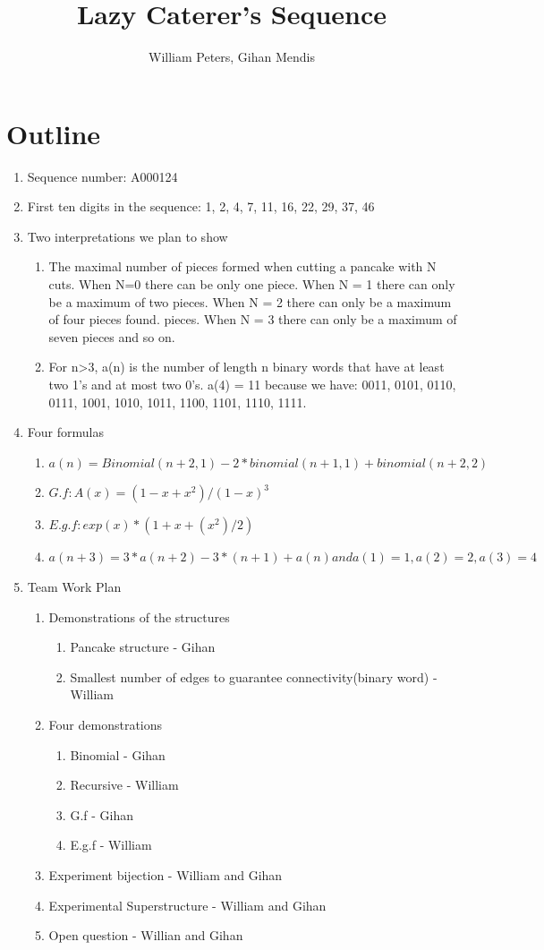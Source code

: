 \documentclass[a4paper,10pt]{article}
\title{Lazy Caterer's Sequence}
\author{William Peters, Gihan Mendis}
\begin{document}
\maketitle

\section{Outline}
\begin{enumerate}
	\item Sequence number: A000124
	\item First ten digits in the sequence: 1, 2, 4, 7, 11, 16, 22, 29, 37, 46 
	\item Two interpretations we plan to show
	\begin{enumerate}
		\item The maximal number of pieces formed when cutting a pancake with N cuts. When N=0 there can be only one piece. When N = 1 there can only be a maximum of two pieces. When N = 2 there can only be a maximum of four pieces found.  pieces. When N = 3 there can only be a maximum of seven pieces and so on.
		\item For n\textgreater3, a(n) is the number of length n binary words that have at least two 1's and at most two 0's. a(4) = 11 because we have: 0011, 0101, 0110, 0111, 1001, 1010, 1011, 1100, 1101, 1110, 1111.	
	\end{enumerate}
	\item Four formulas
	\begin{enumerate}
		\item $a(n) = Binomial(n+2,1)-2 * binomial(n+1,1)+binomial(n+2,2)$
		\item $G.f : A(x) = (1-x+x^2)/(1-x)^3$
		\item $E.g.f:  exp(x)*(1+x+(x^2)/2)$
		\item $a(n+3) = 3 * a(n+2)-3 * (n+1)+a(n) and a(1) = 1, a(2) = 2, a(3) = 4$
	\end{enumerate}
	\item Team Work Plan
	\begin{enumerate}
		\item Demonstrations of the structures
		\begin{enumerate}
			\item Pancake structure - Gihan
			\item Smallest number of edges to guarantee connectivity(binary word) - William
		\end{enumerate}
		\item Four demonstrations
		\begin{enumerate}
			\item Binomial - Gihan
			\item Recursive - William
			\item G.f - Gihan
			\item E.g.f - William
		\end{enumerate}
		\item Experiment bijection - William and Gihan
		\item Experimental Superstructure - William and Gihan
		\item Open question - Willian and Gihan 
	\end{enumerate}
\end{enumerate}
\end{document}

